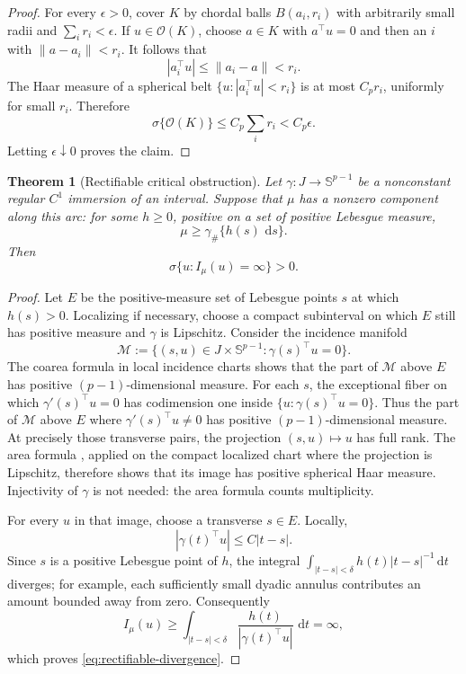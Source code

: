 \documentclass[11pt]{article}
\numberwithin{equation}{section}
\theoremstyle{thmstyleone}%
\newtheorem{theorem}{Theorem}[section]
\theoremstyle{thmstyletwo}%
\let\cref\autoref
\newcommand{\sphere}{\mathbb S}
\newcommand{\dd}{\,\mathrm d}
\begin{document}
\begin{proof}
For every \(\epsilon>0\), cover \(K\) by chordal balls
\(B(a_i,r_i)\) with arbitrarily small radii and
\(\sum_i r_i<\epsilon\).  If \(u\in\mathcal O(K)\), choose
\(a\in K\) with \(a^\top u=0\) and then an \(i\) with
\(\|a-a_i\|<r_i\).  It follows that
\[
  |a_i^\top u|\leq\|a_i-a\|<r_i.
\]
The Haar measure of a spherical belt
\(\{u:|a_i^\top u|<r_i\}\) is at most \(C_pr_i\), uniformly for small
\(r_i\).  Therefore
\[
  \sigma\{\mathcal O(K)\}\leq C_p\sum_i r_i<C_p\epsilon.
\]
Letting \(\epsilon\downarrow0\) proves the claim.
\end{proof}

\begin{theorem}[Rectifiable critical obstruction]
\label{thm:rectifiable-obstruction}
Let \(\gamma:J\to\sphere^{p-1}\) be a nonconstant regular \(C^1\)
immersion of an interval.  Suppose that \(\mu\) has a nonzero
component along this arc: for some \(h\geq0\), positive on a set of positive
Lebesgue measure,
\[
  \mu\geq\gamma_\#\{h(s)\,\dd s\}.
\]
Then
\begin{equation}
  \sigma\{u:I_\mu(u)=\infty\}>0.
  \label{eq:rectifiable-divergence}
\end{equation}
\end{theorem}

\begin{proof}
Let \(E\) be the positive-measure set of Lebesgue points \(s\) at which
\(h(s)>0\).  Localizing if necessary, choose a compact subinterval on
which \(E\) still has positive measure and \(\gamma\) is Lipschitz.
Consider the incidence manifold
\[
  \mathcal M
  :=
  \{(s,u)\in J\times\sphere^{p-1}:\gamma(s)^\top u=0\}.
\]
The coarea formula in local incidence charts shows that the part of
\(\mathcal M\) above \(E\) has positive \((p-1)\)-dimensional measure.
For each \(s\), the exceptional fiber on which
\(\gamma'(s)^\top u=0\) has codimension one inside
\(\{u:\gamma(s)^\top u=0\}\).  Thus the part of \(\mathcal M\) above
\(E\) where \(\gamma'(s)^\top u\neq0\) has positive
\((p-1)\)-dimensional measure.  At precisely those transverse pairs, the
projection \((s,u)\mapsto u\) has full rank.  The area formula
\cite{mattila-1995}, applied on the compact localized chart where the
projection is Lipschitz, therefore shows that its image has positive
spherical Haar measure.  Injectivity of \(\gamma\) is not needed: the area
formula counts multiplicity.

For every \(u\) in that image, choose a transverse \(s\in E\).  Locally,
\[
  |\gamma(t)^\top u|\leq C|t-s|.
\]
Since \(s\) is a positive Lebesgue point of \(h\), the integral
\(\int_{|t-s|<\delta} h(t)|t-s|^{-1}\dd t\) diverges; for example, each sufficiently
small dyadic annulus contributes an amount bounded away from zero.
Consequently
\[
  I_\mu(u)
  \geq
  \int_{|t-s|<\delta}
  \frac{h(t)}{|\gamma(t)^\top u|}\,\dd t
  =\infty,
\]
which proves \cref{eq:rectifiable-divergence}.
\end{proof}
\end{document}
